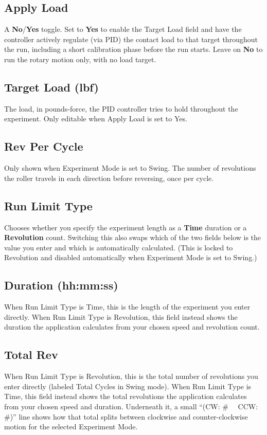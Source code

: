 \documentclass[12pt]{report}
\begin{document}
\subsection{Apply Load}
A \textbf{No}/\textbf{Yes} toggle. Set to \textbf{Yes} to enable the Target Load field and have the controller actively regulate (via PID) the contact load to that target throughout the run, including a short calibration phase before the run starts. Leave on \textbf{No} to run the rotary motion only, with no load target.

\subsection{Target Load (lbf)}
The load, in pounds-force, the PID controller tries to hold throughout the experiment. Only editable when Apply Load is set to Yes.

\subsection{Rev Per Cycle}
Only shown when Experiment Mode is set to Swing. The number of revolutions the roller travels in each direction before reversing, once per cycle.

\subsection{Run Limit Type}
Chooses whether you specify the experiment length as a \textbf{Time} duration or a \textbf{Revolution} count. Switching this also swaps which of the two fields below is the value you enter and which is automatically calculated. (This is locked to Revolution and disabled automatically when Experiment Mode is set to Swing.)

\subsection{Duration (hh:mm:ss)}
When Run Limit Type is Time, this is the length of the experiment you enter directly. When Run Limit Type is Revolution, this field instead shows the duration the application calculates from your chosen speed and revolution count.

\subsection{Total Rev}
When Run Limit Type is Revolution, this is the total number of revolutions you enter directly (labeled Total Cycles in Swing mode). When Run Limit Type is Time, this field instead shows the total revolutions the application calculates from your chosen speed and duration. Underneath it, a small ``(CW: \# \ \ CCW: \#)'' line shows how that total splits between clockwise and counter-clockwise motion for the selected Experiment Mode.
\end{document}
